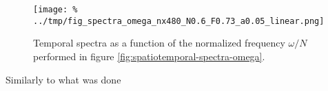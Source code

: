 
\begin{figure}%
\centering
\texttt{[image: \%
../tmp/fig\_spectra\_omega\_nx480\_N0.6\_F0.73\_a0.05\_linear.png]}
\caption{Temporal spectra as a function of the normalized frequency $\omega/N$
performed in figure \ref{fig:spatiotemporal-spectra-omega}.
\label{fig:temporal-spectra}}
\end{figure}

Similarly to what was done
